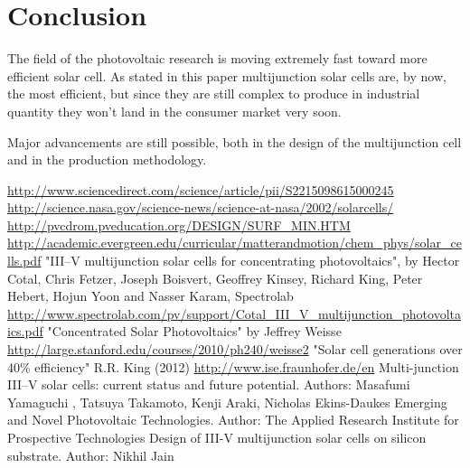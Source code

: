 \documentclass[11pt]{article} %
\begin{document}
\section{Conclusion}

The field of the photovoltaic research is moving extremely fast toward more efficient solar cell. As stated in this paper multijunction solar cells are, by now, the most efficient, but since they are still complex to produce in industrial quantity they won't land in the consumer market very soon.

Major advancements are still possible, both in the design of the multijunction cell and in the production methodology.

\begin{thebibliography}{9}
\bibitem{}
\url{http://www.sciencedirect.com/science/article/pii/S2215098615000245}
\bibitem{}
\url{http://science.nasa.gov/science-news/science-at-nasa/2002/solarcells/}
\bibitem{}
\url{http://pvcdrom.pveducation.org/DESIGN/SURF_MIN.HTM}
\bibitem{}
\url{http://academic.evergreen.edu/curricular/matterandmotion/chem_phys/solar_cells.pdf}
\bibitem{}
	"III–V multijunction solar cells for concentrating photovoltaics", by Hector Cotal, Chris Fetzer, Joseph Boisvert, Geoffrey Kinsey, Richard King, Peter Hebert, Hojun Yoon and Nasser Karam, Spectrolab \url{http://www.spectrolab.com/pv/support/Cotal_III_V_multijunction_photovoltaics.pdf}
\bibitem{}
	"Concentrated Solar Photovoltaics" by Jeffrey Weisse \url{http://large.stanford.edu/courses/2010/ph240/weisse2}
\bibitem{}
	"Solar cell generations over 40\% efficiency" R.R. King (2012) 
\bibitem{}
	\url{http://www.ise.fraunhofer.de/en}
\bibitem{}
	Multi-junction III–V solar cells: current status and future potential. Authors: Masafumi Yamaguchi , Tatsuya Takamoto, Kenji Araki, Nicholas Ekins-Daukes 
\bibitem{}
	Emerging and Novel Photovoltaic Technologies. Author: The Applied Research Institute for Prospective Technologies  
\bibitem{}
	Design of III-V multijunction solar cells on silicon substrate. Author: Nikhil Jain 

\end{thebibliography}
\end{document}
